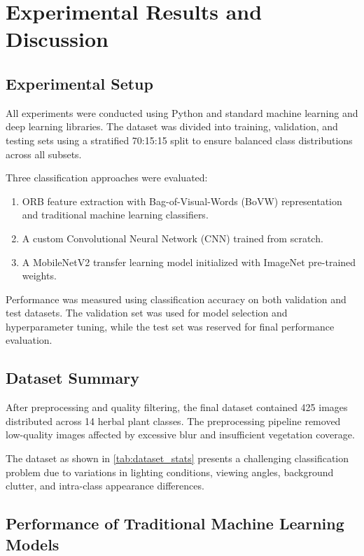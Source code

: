 \section{Experimental Results and Discussion}

\subsection{Experimental Setup}

All experiments were conducted using Python and standard machine learning and deep learning libraries. The dataset was divided into training, validation, and testing sets using a stratified 70:15:15 split to ensure balanced class distributions across all subsets.

Three classification approaches were evaluated:

\begin{enumerate}
\item ORB feature extraction with Bag-of-Visual-Words (BoVW) representation and traditional machine learning classifiers.
\item A custom Convolutional Neural Network (CNN) trained from scratch.
\item A MobileNetV2 transfer learning model initialized with ImageNet pre-trained weights.
\end{enumerate}

Performance was measured using classification accuracy on both validation and test datasets. The validation set was used for model selection and hyperparameter tuning, while the test set was reserved for final performance evaluation.

\subsection{Dataset Summary}

After preprocessing and quality filtering, the final dataset contained 425 images distributed across 14 herbal plant classes. The preprocessing pipeline removed low-quality images affected by excessive blur and insufficient vegetation coverage.


The dataset as shown in \cref{tab:dataset_stats} presents a challenging classification problem due to variations in lighting conditions, viewing angles, background clutter, and intra-class appearance differences.

\subsection{Performance of Traditional Machine Learning Models}


